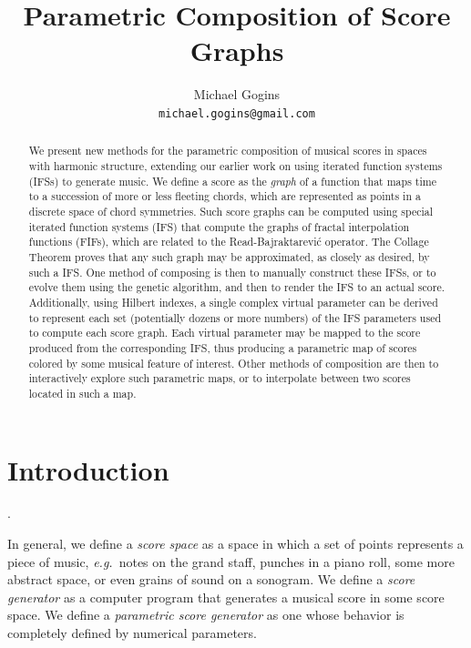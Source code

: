 \documentclass[english,11pt,letterpaper,onecolumn]{scrartcl}
\numberwithin{equation}{section}
\begin{document}
\title{Parametric Composition of Score Graphs}
\author{Michael Gogins \\ \texttt{michael.gogins@gmail.com}}
\maketitle

\begin{abstract}
We present new methods for the parametric composition of musical scores in
spaces with harmonic structure, extending our earlier work on using iterated
function systems (IFSs) to generate music. We define a score as the
\textit{graph} of a function that maps time to a succession of more or less
fleeting chords, which are represented as points in a discrete space of chord
symmetries. Such score graphs can be computed using special iterated function
systems (IFS) that compute the graphs of fractal interpolation functions (FIFs),
which are related to the Read-Bajraktarevi\'c operator. The Collage Theorem
proves that any such graph may be approximated, as closely as desired, by such a
IFS. One method of composing is then to manually construct these IFSs, or to
evolve them using the genetic algorithm, and then to render the IFS to an actual
score. Additionally, using Hilbert indexes, a single complex virtual parameter
can be derived to represent each set (potentially dozens or more numbers) of the
IFS parameters used to compute each score graph. Each virtual parameter may be
mapped to the score produced from the corresponding IFS, thus producing a
parametric map of scores colored by some musical feature of interest. Other
methods of composition are then to interactively explore such parametric maps,
or to interpolate between two scores located in such a map.
\end{abstract}




\section{Introduction}

.

In general, we define a \textit{score space} as a space in which a set of points
represents a piece of music, \textit{e.g.}\ notes on the grand staff, punches in
a piano roll, some more abstract space, or even grains of sound on a sonogram.
We define a \textit{score generator} as a computer program that generates a
musical score in some score space. We define a \textit{parametric score
generator} as one whose behavior is completely defined by numerical parameters.
\end{document}
